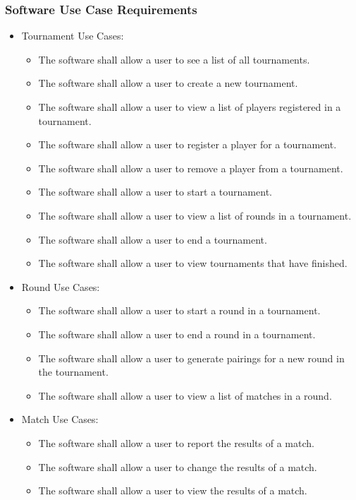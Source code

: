 \documentclass[11pt]{article}
\begin{document}
    \subsubsection{Software Use Case Requirements}
        \begin{itemize}
            \item Tournament Use Cases:
            \begin{itemize}
                \item The software shall allow a user to see a list of all tournaments.
                \item The software shall allow a user to create a new tournament.
                \item The software shall allow a user to view a list of players registered in a tournament.
                \item The software shall allow a user to register a player for a tournament.
                \item The software shall allow a user to remove a player from a tournament.
                \item The software shall allow a user to start a tournament.
                \item The software shall allow a user to view a list of rounds in a tournament.
                \item The software shall allow a user to end a tournament.
                \item The software shall allow a user to view tournaments that have finished.
            \end{itemize}


            \item Round Use Cases:
            \begin{itemize}
                \item The software shall allow a user to start a round in a tournament.
                \item The software shall allow a user to end a round in a tournament.
                \item The software shall allow a user to generate pairings for a new round in the tournament.
                \item The software shall allow a user to view a list of matches in a round.
            \end{itemize}

            \item Match Use Cases:
            \begin{itemize}
                \item The software shall allow a user to report the results of a match.
                \item The software shall allow a user to change the results of a match.
                \item The software shall allow a user to view the results of a match.
            \end{itemize}


\end{itemize}
\end{document}
